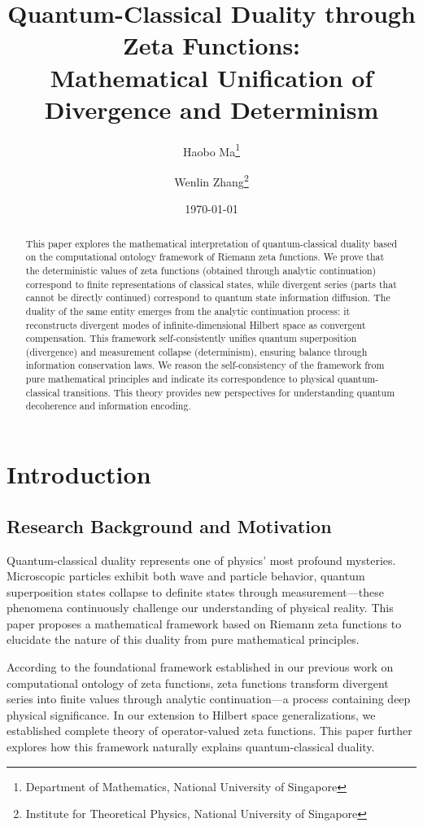 \documentclass[11pt]{article}
\title{\textbf{Quantum-Classical Duality through Zeta Functions:\\Mathematical Unification of Divergence and Determinism}}
\author{
Haobo Ma\thanks{Department of Mathematics, National University of Singapore} \and
Wenlin Zhang\thanks{Institute for Theoretical Physics, National University of Singapore}
}
\date{\today}
\theoremstyle{plain}
\theoremstyle{definition}
\theoremstyle{remark}
\begin{document}
\maketitle

\begin{abstract}
This paper explores the mathematical interpretation of quantum-classical duality based on the computational ontology framework of Riemann zeta functions. We prove that the deterministic values of zeta functions (obtained through analytic continuation) correspond to finite representations of classical states, while divergent series (parts that cannot be directly continued) correspond to quantum state information diffusion. The duality of the same entity emerges from the analytic continuation process: it reconstructs divergent modes of infinite-dimensional Hilbert space as convergent compensation. This framework self-consistently unifies quantum superposition (divergence) and measurement collapse (determinism), ensuring balance through information conservation laws. We reason the self-consistency of the framework from pure mathematical principles and indicate its correspondence to physical quantum-classical transitions. This theory provides new perspectives for understanding quantum decoherence and information encoding.
\end{abstract}

\section{Introduction}

\subsection{Research Background and Motivation}

Quantum-classical duality represents one of physics' most profound mysteries. Microscopic particles exhibit both wave and particle behavior, quantum superposition states collapse to definite states through measurement—these phenomena continuously challenge our understanding of physical reality. This paper proposes a mathematical framework based on Riemann zeta functions to elucidate the nature of this duality from pure mathematical principles.

According to the foundational framework established in our previous work on computational ontology of zeta functions, zeta functions transform divergent series into finite values through analytic continuation—a process containing deep physical significance. In our extension to Hilbert space generalizations, we established complete theory of operator-valued zeta functions. This paper further explores how this framework naturally explains quantum-classical duality.
\end{document}
